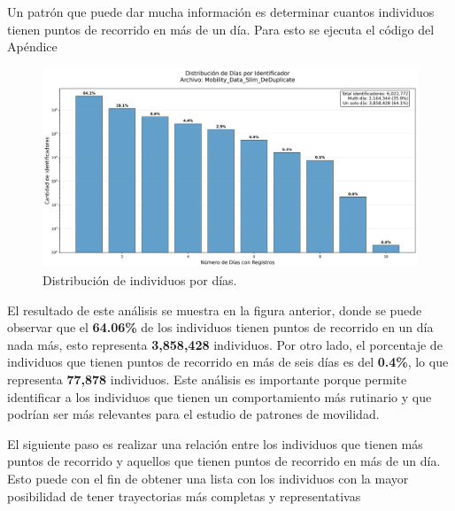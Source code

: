 Un patrón que puede dar mucha información es determinar cuantos individuos tienen puntos de recorrido en más de un día. Para esto se ejecuta el código del Apéndice 

\begin{figure}[H]
  \centering
  \includegraphics[width=\textwidth]{img/multi_day_analysis_Mobility_Data_Slim_DeDuplicate.png}
  \caption{Distribución de individuos por días.}
  \label{fig:multi_day_analysis}
\end{figure}

El resultado de este análisis se muestra en la figura anterior, donde se puede observar que el \textbf{64.06\%} de los individuos tienen puntos de recorrido en un día nada más, esto representa \textbf{3,858,428} individuos. Por otro lado, el porcentaje de individuos que tienen puntos de recorrido en más de seis días es del \textbf{0.4\%}, lo que representa \textbf{77,878} individuos. Este análisis es importante porque permite identificar a los individuos que tienen un comportamiento más rutinario y que podrían ser más relevantes para el estudio de patrones de movilidad. 

El siguiente paso es realizar una relación entre los individuos que tienen más puntos de recorrido y aquellos que tienen puntos de recorrido en más de un día. Esto puede con el fin de obtener una lista con los individuos con la mayor posibilidad de tener trayectorias más completas y representativas